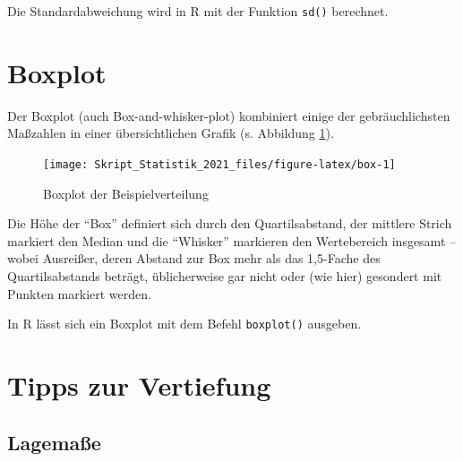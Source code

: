\documentclass[
  11pt,
  ngerman,
  a4paper,
]{report}
\newenvironment{rtip}{
  \medskip
  \begin{tcolorbox}[colframe=purple,colback=light_gray,title=Softwarehinweis]
}{
  \end{tcolorbox}
  \medskip
}
\begin{document}
\begin{rtip}
Die Standardabweichung wird in R mit der Funktion \verb|sd()| berechnet.
\end{rtip}

\hypertarget{boxplot}{%
\section{Boxplot}\label{boxplot}}

Der Boxplot (auch Box-and-whisker-plot) kombiniert einige der gebräuchlichsten Maßzahlen in einer übersichtlichen Grafik (s. Abbildung \ref{fig:box}).

\begin{figure}[!h]

{\centering \texttt{[image: Skript\_Statistik\_2021\_files/figure-latex/box-1]} 

}

\caption{Boxplot der Beispielverteilung}\label{fig:box}
\end{figure}

Die Höhe der \enquote{Box} definiert sich durch den Quartilsabstand, der mittlere Strich markiert den Median und die \enquote{Whisker} markieren den Wertebereich insgesamt -- wobei Ausreißer, deren Abstand zur Box mehr als das 1,5-Fache des Quartilsabstands beträgt, üblicherweise gar nicht oder (wie hier) gesondert mit Punkten markiert werden.

\begin{rtip}
In R lässt sich ein Boxplot mit dem Befehl \verb|boxplot()| ausgeben.
\end{rtip}

\hypertarget{tipps-zur-vertiefung-1}{%
\section*{Tipps zur Vertiefung}\label{tipps-zur-vertiefung-1}}

\hypertarget{lagemauxdfe-1}{%
\subsection{Lagemaße}\label{lagemauxdfe-1}}
\end{document}
